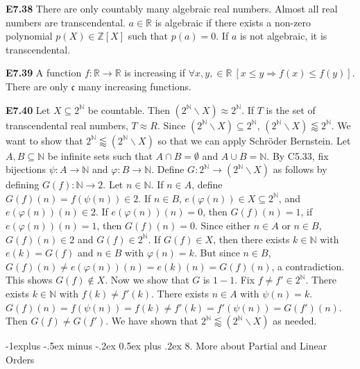 \documentclass[10pt, landscape]{article}
\makeatletter
\renewcommand{\section}{\@startsection{section}{1}{0mm}%
                                {-1ex plus -.5ex minus -.2ex}%
                                {0.5ex plus .2ex}%
                                {\normalfont\large\bfseries}}
\renewcommand{\section}{\@startsection{section}{2}{0mm}%
                                {-1explus -.5ex minus -.2ex}%
                                {0.5ex plus .2ex}%
                                {\normalfont\normalsize\bfseries}}
\renewcommand{\subsection}{\@startsection{subsection}{3}{0mm}%
                                {-1ex plus -.5ex minus -.2ex}%
                                {1ex plus .2ex}%
                                {\normalfont\small\bfseries}}%
\makeatother
\begin{document}
\begin{multicols*}{3}
\textbf{E7.38} There are only countably many algebraic real numbers. Almost all real numbers are transcendental. $a \in \mathbb{R}$ is algebraic if there exists a non-zero polynomial $p(X) \in \mathbb{Z}[X]$ such that $p(a)=0$. If $a$ is not algebraic, it is transcendental.

\textbf{E7.39} A function $f : \mathbb{R} \rightarrow \mathbb{R}$ is increasing if $\forall x, y, \in \mathbb{R} \ [x \leq y \Rightarrow f(x) \leq f(y)]$. There are only $\mathfrak{c}$ many increasing functions.

\textbf{E7.40} Let $X \subseteq 2^\mathbb{N}$ be countable. Then $(2^\mathbb{N} \backslash X) \approx 2^\mathbb{N}$. If $T$ is the set of transcendental real numbers, $T \approx R$. Since $(2^\mathbb{N} \backslash X) \subseteq 2^\mathbb{N}$, $(2^\mathbb{N} \backslash X) \lessapprox 2^\mathbb{N}$. We want to show that $2^\mathbb{N} \lessapprox (2^\mathbb{N} \backslash X)$ so that we can apply Schröder Bernstein. Let $A, B \subseteq \mathbb{N}$ be infinite sets such that $A \cap B = \emptyset$ and $A \cup B = \mathbb{N}$. By C5.33, fix bijections $\psi : A \rightarrow \mathbb{N}$ and $\varphi : B \rightarrow \mathbb{N}$. Define $G:2^\mathbb{N} \rightarrow (2^\mathbb{N} \backslash X)$ as follows by defining $G(f): \mathbb{N} \rightarrow 2$. Let $n \in \mathbb{N}$. If $n \in A$, define $G(f)(n)=f(\psi(n))\in 2$. If $n \in B$, $e(\varphi(n))\in X \subseteq 2^\mathbb{N}$, and $e(\varphi(n))(n)\in 2$. If $e(\varphi(n))(n)=0$, then $G(f)(n)=1$, if $e(\varphi(n))(n)=1$, then $G(f)(n)=0$. Since either $n \in A$ or $n \in B$, $G(f)(n)\in2$ and $G(f) \in 2^\mathbb{N}$. If $G(f) \in X$, then there exists $k \in \mathbb{N}$ with $e(k)=G(f)$ and $n \in B$ with $\varphi(n)=k$. But since $n \in B$, $G(f)(n) \neq e(\varphi(n))(n)=e(k)(n)=G(f)(n)$, a contradiction. This shows $G(f) \notin X$. Now we show that $G$ is $1-1$. Fix $f \neq f' \in 2^\mathbb{N}$. There exists $k \in \mathbb{N}$ with $f(k) \neq f'(k)$. There exists $n \in A$ with $\psi(n)=k$. $G(f)(n)=f(\psi(n))=f(k)\neq f'(k) =f'(\psi(n))=G(f')(n)$. Then $G(f)\neq G(f')$. We have shown that $2^\mathbb{N} \lessapprox (2^\mathbb{N}\backslash X)$ as needed.

\section{8. More about Partial and Linear Orders}


\end{multicols*}
\end{document}

